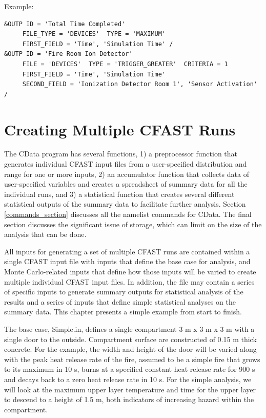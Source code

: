 \documentclass[12pt,twoside]{book}
\begin{document}
\vspace{\baselineskip}
\noindent Example:
\begin{lstlisting}[basicstyle=\scriptsize]
&OUTP ID = 'Total Time Completed'
     FILE_TYPE = 'DEVICES'  TYPE = 'MAXIMUM'
     FIRST_FIELD = 'Time', 'Simulation Time' /
&OUTP ID = 'Fire Room Ion Detector'
     FILE = 'DEVICES'  TYPE = 'TRIGGER_GREATER'  CRITERIA = 1
     FIRST_FIELD = 'Time', 'Simulation Time'
     SECOND_FIELD = 'Ionization Detector Room 1', 'Sensor Activation' /
\end{lstlisting}

\clearpage

%
%


\chapter{Creating Multiple CFAST Runs}
The CData program has several functions, 1) a preprocessor function that generates individual CFAST input files from a user-specified distribution and range for one or more inputs, 2) an accumulator function that collects  data of user-specified variables and creates a spreadsheet of summary data for all the individual runs, and 3) a statistical function that creates several different statistical outputs of the summary data to facilitate further analysis.  Section \ref{commands_section} discusses all the namelist commands for CData. The final section discusses the significant issue of storage, which can limit on the size of the analysis that can be done.

All inputs for generating a set of multiple CFAST runs are contained within a single CFAST input file with inputs that define the base case for analysis, and Monte Carlo-related inputs that define how those inputs will be varied to create multiple individual CFAST input files. In addition, the file may contain a series of specific inputs to generate summary outputs for statistical analysis of the results and a series of inputs that define simple statistical analyses on the summary data.  This chapter presents a simple example from start to finish.

The base case, {\ct Simple.in}, defines a single compartment 3 m x 3 m x 3 m with a single door to the outside.  Compartment surface are constructed of 0.15 m thick concrete. For the example, the width and height of the door will be varied along with the peak heat release rate of the fire, assumed to be a simple fire that grows to its maximum in 10 s, burns at a specified constant heat release rate for 900 s and decays back to a zero heat release rate in 10 s. For the simple analysis, we will look at the maximum upper layer temperature and time for the upper layer to descend to a height of 1.5 m, both indicators of increasing hazard within the compartment.
\end{document}
